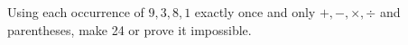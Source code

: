 Using each occurrence of $9,3,8,1$ exactly once and only $+,-,\times,\div$ and parentheses, make 24 or prove it impossible.
